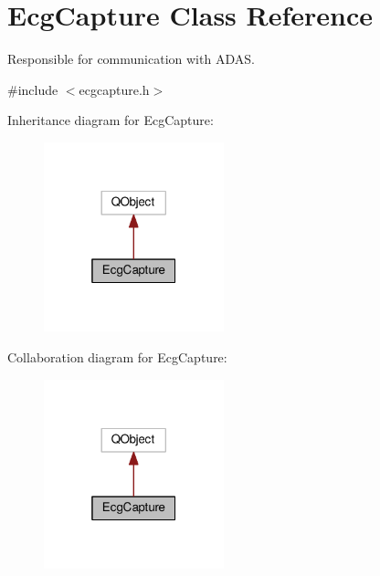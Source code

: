 \hypertarget{classEcgCapture}{}\section{Ecg\+Capture Class Reference}
\label{classEcgCapture}


Responsible for communication with A\+D\+AS.  




{\ttfamily \#include $<$ecgcapture.\+h$>$}



Inheritance diagram for Ecg\+Capture\+:\nopagebreak
\begin{figure}[H]
\begin{center}
\leavevmode
\includegraphics[width=148pt]{classEcgCapture__inherit__graph}
\end{center}
\end{figure}


Collaboration diagram for Ecg\+Capture\+:\nopagebreak
\begin{figure}[H]
\begin{center}
\leavevmode
\includegraphics[width=148pt]{classEcgCapture__coll__graph}
\end{center}
\end{figure}
